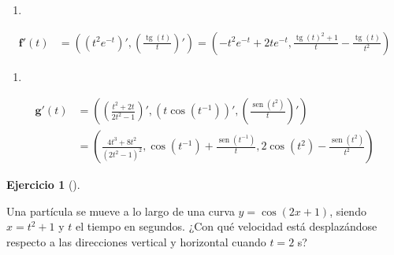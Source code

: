 \documentclass[
  spanish,
  a4paper,
]{scrreport}
\providecommand{\tightlist}{%
  \setlength{\itemsep}{0pt}\setlength{\parskip}{0pt}}
\theoremstyle{definition}
\newtheorem{exercise}{Ejercicio}[chapter]
\theoremstyle{remark}
\begin{document}
\begin{tcolorbox}[enhanced jigsaw, arc=.35mm, bottomrule=.15mm, bottomtitle=1mm, breakable, colback=white, colbacktitle=quarto-callout-tip-color!10!white, colframe=quarto-callout-tip-color-frame, coltitle=black, left=2mm, leftrule=.75mm, opacityback=0, opacitybacktitle=0.6, rightrule=.15mm, title=\textcolor{quarto-callout-tip-color}{\faLightbulb}\hspace{0.5em}{Solución}, titlerule=0mm, toprule=.15mm, toptitle=1mm]

\begin{enumerate}
\def\labelenumi{\alph{enumi}.}
\tightlist
\item
\end{enumerate}

\begin{align*}
\mathbf{f}'(t) 
&= \left((t^2e^{-t})', \left(\frac{\operatorname{tg}(t)}{t}\right)' \right) 
= \left(-t^{2}e^{-t} + 2te^{-t}, \frac{\operatorname{tg}(t)^2 + 1}{t} - \frac{\operatorname{tg}(t)}{t^{2}}\right)
\end{align*}

\begin{enumerate}
\def\labelenumi{\alph{enumi}.}
\tightlist
\item
\end{enumerate}

\begin{align*}
\mathbf{g}'(t)
&= \left(\left(\frac{t^2+2t}{2t^2-1}\right)',( t\cos(t^{-1}))', \left(\frac{\operatorname{sen}(t^2)}{t}\right)' \right) \\
&= \left(\frac{4t^3+8t^2}{(2t^2-1)^2}, \cos(t^{-1})+\frac{\operatorname{sen}(t^{-1})}{t}, 2\cos(t^2)-\frac{\operatorname{sen}(t^2)}{t^2}\right)
\end{align*}

\end{tcolorbox}

\begin{exercise}[]\protect\hypertarget{exr-cinematica-1}{}\label{exr-cinematica-1}

Una partícula se mueve a lo largo de una curva \(y=\cos(2x+1)\), siendo
\(x=t^2+1\) y \(t\) el tiempo en segundos. ¿Con qué velocidad está
desplazándose respecto a las direcciones vertical y horizontal cuando
\(t=2\) s?

\end{exercise}
\end{document}
